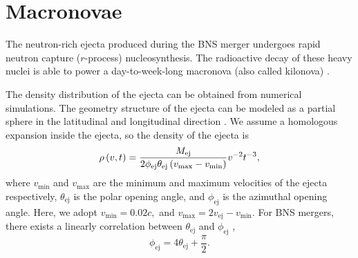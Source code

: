 \documentclass{emulateapj}
\begin{document}
\section{Macronovae}
The neutron-rich ejecta produced during the BNS merger
undergoes rapid neutron capture ($r$-process) nucleosynthesis. The
radioactive decay of these heavy nuclei is able to power a day-to-week-long
macronova (also called kilonova)
\citep{li98,kul05,met10,kas13,tan13,met17}.


The density distribution of the ejecta can be obtained from numerical
simulations. The geometry structure of the ejecta can be modeled as a partial sphere in the
latitudinal and longitudinal direction \citep{kyu13,kyu15}.  We
assume a homologous expansion inside the ejecta, so the
density of the ejecta is \citep{kaw16}
\begin{equation}
\rho \left( v,t\right) =\frac{M_{\text{ej}}}{2\phi _{\text{ej}}\theta _{%
\text{ej}}\left( v_{\max }-v_{\min }\right) }v^{-2}t^{-3},
\end{equation}
where $v_{\min }$ and $v_{\text{max}}$ are the minimum and
maximum velocities of the ejecta respectively, $\theta _{\text{ej}}$
is the polar opening angle, and $\phi _{\text{ej}}$ is the azimuthal
opening angle. Here, we adopt $v_{\min }=0.02c,$ and $%
v_{\text{max}}=2v_{\text{ej}}-v_{\min }$. For BNS mergers, there exists a
linearly correlation between $\theta _{\text{ej}}$ and $\phi
_{\text{ej}}$ \citep{die17},
\begin{equation}
\phi _{\text{ej}}=4\theta _{\text{ej}}+\frac{\pi }{2}.
\end{equation}
\end{document}
